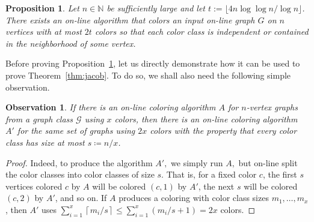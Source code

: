 \documentclass[10pt]{amsart}
\newtheorem{observation}[theorem]{Observation}
\newtheorem{proposition}[theorem]{Proposition}
\theoremstyle{definition}
\newcommand{\calG}{\mathcal{G}}
\newcommand{\ceil}[1]{
    \left\lceil #1 \right\rceil
}
\begin{document}
\begin{proposition}\label{prop:main2}
Let $n\in \mathbb{N}$ be sufficiently large and let $t:=\lfloor 4n \log \log n / \log n\rfloor$. There exists an on-line algorithm that colors an input on-line graph $G$ on $n$ vertices with at most $2t$ colors so that each color class is independent or contained in the neighborhood of some vertex.
\end{proposition}
Before proving Proposition~\ref{prop:main2}, let us directly demonstrate how it can be used to prove Theorem~\ref{thm:jacob}. 
To do so, we shall also need the following simple observation.
\begin{observation} \label{obs:small-color-classes}
    If there is an on-line coloring algorithm $A$ for $n$-vertex graphs from a graph class $\calG$ using $x$ colors, then there is an on-line coloring algorithm $A'$ for the same set of graphs using $2x$ colors with the property that every color class has size at most $s \coloneqq n/x$.    
\end{observation}
\begin{proof}
    Indeed, to produce the algorithm $A',$ we simply run $A,$ but on-line split the color classes into color classes of size $s$. That is, for a fixed color $c$, the first $s$ vertices colored $c$ by $A$ will be colored $(c,1)$ by $A'$, the next $s$ will be colored $(c, 2)$ by $A'$, and so on. If $A$ produces a coloring with color class sizes $m_1, \dots, m_x$, then $A'$ uses $\sum_{i=1}^x \ceil{m_i/s} \le \sum_{i=1}^x (m_i/s + 1) = 2x$ colors.
\end{proof}
\end{document}
